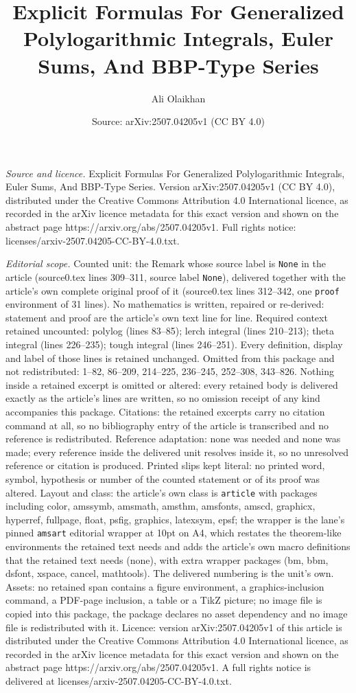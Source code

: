 \documentclass[10pt,a4paper]{amsart}
\title[Explicit Formulas For Generalized Polylogarithmic Integrals,]{Explicit Formulas For Generalized Polylogarithmic Integrals, Euler Sums, And BBP-Type Series}
\author{Ali Olaikhan}
\date{Source: arXiv:2507.04205v1 (CC BY 4.0)}
\begin{document}
\maketitle

\noindent\emph{Source and licence.} Explicit Formulas For Generalized Polylogarithmic Integrals, Euler Sums, And BBP-Type Series. Version arXiv:2507.04205v1 (CC BY 4.0), distributed under the Creative Commons Attribution 4.0 International licence, as recorded in the arXiv licence metadata for this exact version and shown on the abstract page https://arxiv.org/abs/2507.04205v1. Full rights notice: licenses/arxiv-2507.04205-CC-BY-4.0.txt.\par\smallskip

\noindent\textit{Editorial scope.} Counted unit: the Remark whose source label is \texttt{None} in the article (source0.tex lines 309--311, source label \texttt{None}), delivered together with the article's own complete original proof of it (source0.tex lines 312--342, one \texttt{proof} environment of 31 lines). No mathematics is written, repaired or re-derived: statement and proof are the article's own text line for line. Required context retained uncounted: polylog (lines 83--85); lerch integral (lines 210--213); theta integral (lines 226--235); tough integral (lines 246--251). Every definition, display and label of those lines is retained unchanged. Omitted from this package and not redistributed: 1--82, 86--209, 214--225, 236--245, 252--308, 343--826. Nothing inside a retained excerpt is omitted or altered: every retained body is delivered exactly as the article's lines are written, so no omission receipt of any kind accompanies this package. Citations: the retained excerpts carry no citation command at all, so no bibliography entry of the article is transcribed and no reference is redistributed. Reference adaptation: none was needed and none was made; every reference inside the delivered unit resolves inside it, so no unresolved reference or citation is produced. Printed slips kept literal: no printed word, symbol, hypothesis or number of the counted statement or of its proof was altered. Layout and class: the article's own class is \texttt{article} with packages including color, amssymb, amsmath, amsthm, amsfonts, amscd, graphicx, hyperref, fullpage, float, psfig, graphics, latexsym, epsf; the wrapper is the lane's pinned \texttt{amsart} editorial wrapper at 10pt on A4, which restates the theorem-like environments the retained text needs and adds the article's own macro definitions that the retained text needs (none), with extra wrapper packages (bm, bbm, dsfont, xspace, cancel, mathtools). The delivered numbering is the unit's own. Assets: no retained span contains a figure environment, a graphics-inclusion command, a PDF-page inclusion, a table or a TikZ picture; no image file is copied into this package, the package declares no asset dependency and no image file is redistributed with it. Licence: version arXiv:2507.04205v1 of this article is distributed under the Creative Commons Attribution 4.0 International licence, as recorded in the arXiv licence metadata for this exact version and shown on the abstract page https://arxiv.org/abs/2507.04205v1. A full rights notice is delivered at licenses/arxiv-2507.04205-CC-BY-4.0.txt. 
\end{document}
